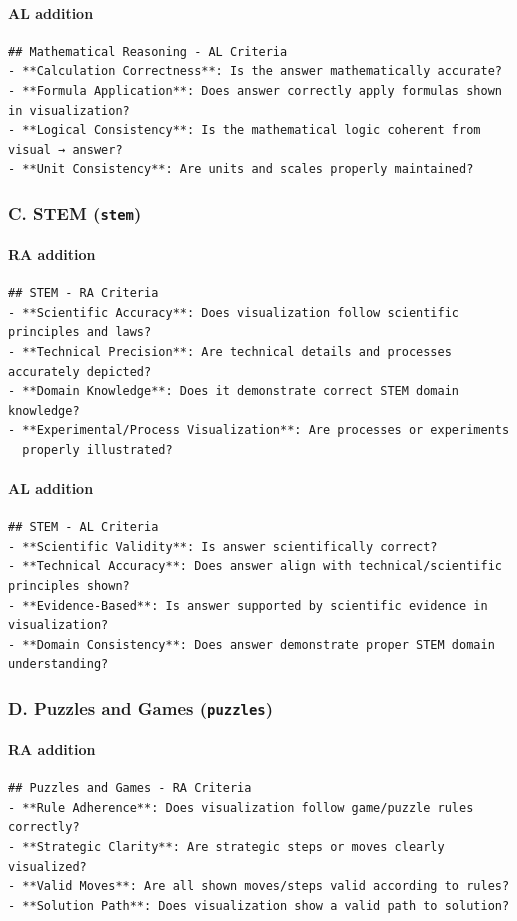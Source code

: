 \documentclass{article}
\theoremstyle{plain}
\theoremstyle{definition}
\theoremstyle{remark}
\begin{document}
\paragraph{AL addition}
\begin{verbatim}
## Mathematical Reasoning - AL Criteria
- **Calculation Correctness**: Is the answer mathematically accurate?
- **Formula Application**: Does answer correctly apply formulas shown in visualization?
- **Logical Consistency**: Is the mathematical logic coherent from visual → answer?
- **Unit Consistency**: Are units and scales properly maintained?
\end{verbatim}

\subsubsection*{C. STEM (\texttt{stem})}
\paragraph{RA addition}
\begin{verbatim}
## STEM - RA Criteria
- **Scientific Accuracy**: Does visualization follow scientific principles and laws?
- **Technical Precision**: Are technical details and processes accurately depicted?
- **Domain Knowledge**: Does it demonstrate correct STEM domain knowledge?
- **Experimental/Process Visualization**: Are processes or experiments
  properly illustrated?
\end{verbatim}
\paragraph{AL addition}
\begin{verbatim}
## STEM - AL Criteria
- **Scientific Validity**: Is answer scientifically correct?
- **Technical Accuracy**: Does answer align with technical/scientific principles shown?
- **Evidence-Based**: Is answer supported by scientific evidence in visualization?
- **Domain Consistency**: Does answer demonstrate proper STEM domain understanding?
\end{verbatim}

\subsubsection*{D. Puzzles and Games (\texttt{puzzles})}
\paragraph{RA addition}
\begin{verbatim}
## Puzzles and Games - RA Criteria
- **Rule Adherence**: Does visualization follow game/puzzle rules correctly?
- **Strategic Clarity**: Are strategic steps or moves clearly visualized?
- **Valid Moves**: Are all shown moves/steps valid according to rules?
- **Solution Path**: Does visualization show a valid path to solution?
\end{verbatim}
\end{document}

